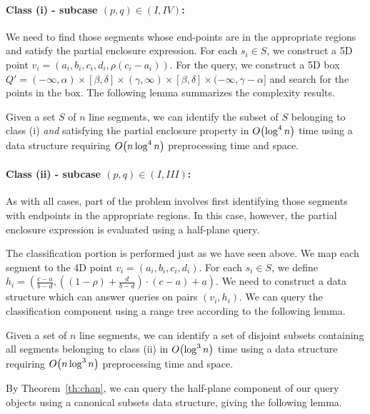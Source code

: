 \paragraph{Class (i) - subcase $(p, q) \in (I, IV)$:}

We need to find those segments whose end-points are in the appropriate regions 
and satisfy the partial enclosure expression. For each $s_i \in S$, we construct 
a 5D 
point $v_i = (a_i, b_i, c_i, d_i, \rho(c_i - a_i))$. For the query, we construct 
a 5D box
$Q'= (-\infty, \alpha) \times [\beta, \delta] \times (\gamma, \infty) 
\times [\beta, \delta] \times (-\infty, \gamma - \alpha]$ and search for the 
points in the box. 
 The following lemma summarizes the complexity results. 

\begin{lemma}
\label{lem:ao:class1:v}
Given a set $S$ of $n$ line segments, we can identify the subset of $S$ 
belonging to class (i) \emph{and} satisfying the partial enclosure property 
in $O\!\left(\log^4{n}\right)$ time using a data structure requiring 
$O\!\left(n \log^4{n}\right)$ preprocessing time and space.
\end{lemma}

\paragraph{Class (ii) - subcase $(p, q) \in (I, III)$:} 
As with all cases, part of the problem involves first identifying those segments 
with endpoints in the appropriate regions.
In this case, however, the partial enclosure expression is evaluated using a 
half-plane query.

The classification portion is performed just as we have seen above. We map each 
segment to the 4D point $v_i = ( a_i, b_i, c_i, d_i )$.
For each $s_i \in S$, we define $h_i = \left ( \frac{c - a}{b - d}, \left ( (1 - 
\rho) + \frac{d}{b-d} \right ) \cdot (c-a) + a \right )$.
We need to construct a data structure which can answer queries on pairs $(v_i, 
h_i)$.
We can query the classification component using a range tree according to the 
following lemma.
\begin{lemma}
\label{lem:ao:class2:v}
Given a set of $n$ line segments, we can identify a set of disjoint subsets 
containing all segments belonging to class (ii) in $O\!\left(\log^3{n}\right)$ time 
using a data structure requiring $O\!\left(n\log^3{n}\right)$ preprocessing time and 
space.
\end{lemma}

By Theorem~\ref{th:chan}, we can query the half-plane component of our query 
objects using a canonical subsets data structure, giving the following lemma.

